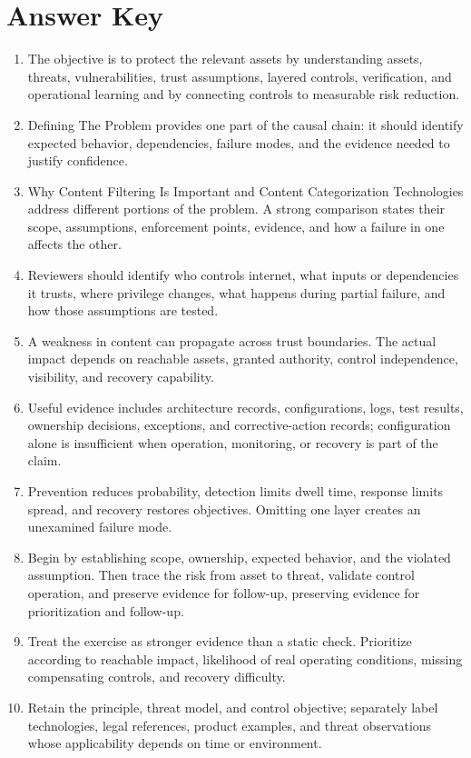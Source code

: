 \documentclass[11pt,letterpaper]{article}
\begin{document}
\section*{Answer Key}
\begin{enumerate}
\item The objective is to protect the relevant assets by understanding assets, threats, vulnerabilities, trust assumptions, layered controls, verification, and operational learning and by connecting controls to measurable risk reduction.
\item Defining The Problem provides one part of the causal chain: it should identify expected behavior, dependencies, failure modes, and the evidence needed to justify confidence.
\item Why Content Filtering Is Important and Content Categorization Technologies address different portions of the problem. A strong comparison states their scope, assumptions, enforcement points, evidence, and how a failure in one affects the other.
\item Reviewers should identify who controls internet, what inputs or dependencies it trusts, where privilege changes, what happens during partial failure, and how those assumptions are tested.
\item A weakness in content can propagate across trust boundaries. The actual impact depends on reachable assets, granted authority, control independence, visibility, and recovery capability.
\item Useful evidence includes architecture records, configurations, logs, test results, ownership decisions, exceptions, and corrective-action records; configuration alone is insufficient when operation, monitoring, or recovery is part of the claim.
\item Prevention reduces probability, detection limits dwell time, response limits spread, and recovery restores objectives. Omitting one layer creates an unexamined failure mode.
\item Begin by establishing scope, ownership, expected behavior, and the violated assumption. Then trace the risk from asset to threat, validate control operation, and preserve evidence for follow-up, preserving evidence for prioritization and follow-up.
\item Treat the exercise as stronger evidence than a static check. Prioritize according to reachable impact, likelihood of real operating conditions, missing compensating controls, and recovery difficulty.
\item Retain the principle, threat model, and control objective; separately label technologies, legal references, product examples, and threat observations whose applicability depends on time or environment.
\end{enumerate}
\end{document}
